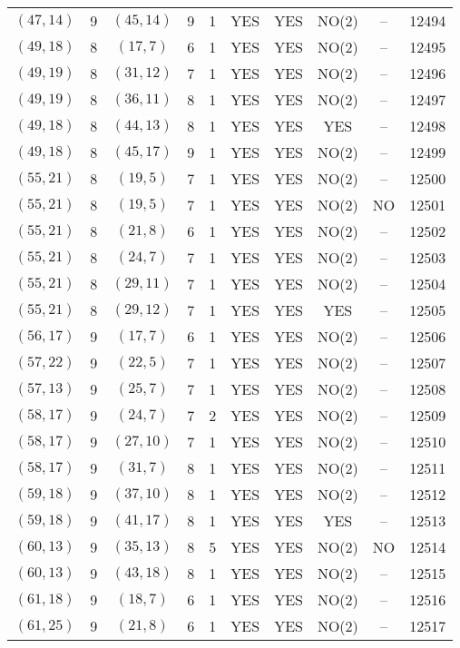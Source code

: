 \begin{longtable}{|c|c|c|c|c|c|c|c|c|c|}
$(47, 14)$ & 9 & $(45, 14)$ & 9 & 1 & YES & YES & NO(2) & -- & 12494\\
$(49, 18)$ & 8 & $(17, 7)$ & 6 & 1 & YES & YES & NO(2) & -- & 12495\\
$(49, 19)$ & 8 & $(31, 12)$ & 7 & 1 & YES & YES & NO(2) & -- & 12496\\
$(49, 19)$ & 8 & $(36, 11)$ & 8 & 1 & YES & YES & NO(2) & -- & 12497\\
$(49, 18)$ & 8 & $(44, 13)$ & 8 & 1 & YES & YES & YES & -- & 12498\\
$(49, 18)$ & 8 & $(45, 17)$ & 9 & 1 & YES & YES & NO(2) & -- & 12499\\
$(55, 21)$ & 8 & $(19, 5)$ & 7 & 1 & YES & YES & NO(2) & -- & 12500\\
$(55, 21)$ & 8 & $(19, 5)$ & 7 & 1 & YES & YES & NO(2) & NO & 12501\\
$(55, 21)$ & 8 & $(21, 8)$ & 6 & 1 & YES & YES & NO(2) & -- & 12502\\
$(55, 21)$ & 8 & $(24, 7)$ & 7 & 1 & YES & YES & NO(2) & -- & 12503\\
$(55, 21)$ & 8 & $(29, 11)$ & 7 & 1 & YES & YES & NO(2) & -- & 12504\\
$(55, 21)$ & 8 & $(29, 12)$ & 7 & 1 & YES & YES & YES & -- & 12505\\
$(56, 17)$ & 9 & $(17, 7)$ & 6 & 1 & YES & YES & NO(2) & -- & 12506\\
$(57, 22)$ & 9 & $(22, 5)$ & 7 & 1 & YES & YES & NO(2) & -- & 12507\\
$(57, 13)$ & 9 & $(25, 7)$ & 7 & 1 & YES & YES & NO(2) & -- & 12508\\
$(58, 17)$ & 9 & $(24, 7)$ & 7 & 2 & YES & YES & NO(2) & -- & 12509\\
$(58, 17)$ & 9 & $(27, 10)$ & 7 & 1 & YES & YES & NO(2) & -- & 12510\\
$(58, 17)$ & 9 & $(31, 7)$ & 8 & 1 & YES & YES & NO(2) & -- & 12511\\
$(59, 18)$ & 9 & $(37, 10)$ & 8 & 1 & YES & YES & NO(2) & -- & 12512\\
$(59, 18)$ & 9 & $(41, 17)$ & 8 & 1 & YES & YES & YES & -- & 12513\\
$(60, 13)$ & 9 & $(35, 13)$ & 8 & 5 & YES & YES & NO(2) & NO & 12514\\
$(60, 13)$ & 9 & $(43, 18)$ & 8 & 1 & YES & YES & NO(2) & -- & 12515\\
$(61, 18)$ & 9 & $(18, 7)$ & 6 & 1 & YES & YES & NO(2) & -- & 12516\\
$(61, 25)$ & 9 & $(21, 8)$ & 6 & 1 & YES & YES & NO(2) & -- & 12517\\

\end{longtable}
